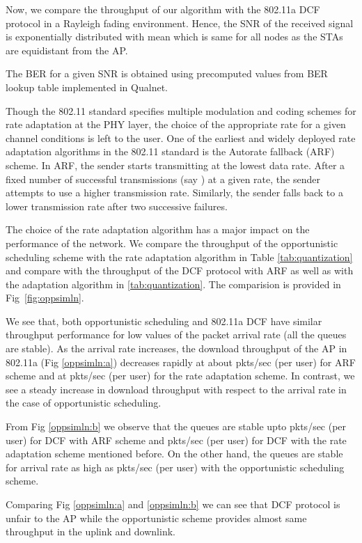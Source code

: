 \documentclass[10pt,conference]{IEEEtran}
\begin{document}
Now, we compare the throughput of our algorithm with the 802.11a DCF protocol in a Rayleigh fading environment. 
Hence, the SNR of the received signal is exponentially distributed with mean  which is same for all nodes as the STAs are equidistant from the AP.

The BER for a given SNR is obtained using precomputed values from 
BER lookup table implemented in Qualnet. 

  Though the 802.11 standard specifies multiple modulation and coding schemes for rate adaptation 
at the PHY layer, the choice of the appropriate rate for a given channel conditions is left to the user. 
One of the earliest and widely deployed rate adaptation algorithms in the 802.11 standard is the Autorate fallback (ARF) scheme. In ARF, the sender starts transmitting at the lowest data rate.
 After a fixed number of successful transmissions (say ) at a given rate, the sender attempts to use a higher transmission rate. Similarly, the sender falls back to a lower transmission rate after two successive failures.

The choice of the rate adaptation algorithm has a major impact on the performance of the network.
We compare the throughput of the opportunistic scheduling scheme with the rate adaptation algorithm in Table \ref{tab:quantization}  and compare with the throughput of the DCF protocol with ARF as well as with
the adaptation algorithm in \ref{tab:quantization}.
The comparision is provided in Fig~\ref{fig:oppsimln}.

 We see that, both opportunistic scheduling and 802.11a DCF have similar throughput performance for low values of the packet arrival rate (all the queues are stable).
 As the arrival rate increases, the download throughput of the AP in 802.11a (Fig \ref{oppsimln:a}) decreases rapidly at about  pkts/sec (per user) for ARF scheme and at  pkts/sec (per user) for the rate adaptation scheme.
 In contrast, we see a steady increase in download throughput with respect to the arrival rate in the case of opportunistic scheduling.  

 From Fig \ref{oppsimln:b} we observe that the queues are stable upto  pkts/sec (per user) for DCF with ARF scheme and  pkts/sec (per user) for DCF with the rate adaptation scheme mentioned before.
 On the other hand, the queues are stable for arrival rate as high as  pkts/sec (per user) with the opportunistic scheduling scheme.

 Comparing Fig \ref{oppsimln:a} and \ref{oppsimln:b} we can see that DCF protocol is unfair to the AP while the opportunistic scheme provides almost same throughput in the uplink and downlink.
\end{document}
